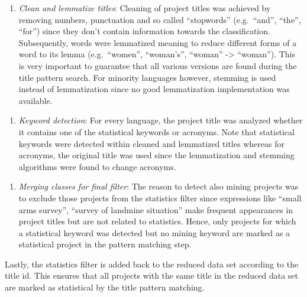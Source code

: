 \documentclass[
]{article}
\providecommand{\tightlist}{%
  \setlength{\itemsep}{0pt}\setlength{\parskip}{0pt}}
\begin{document}
\begin{enumerate}
  \begin{enumerate}
  \def\labelenumii{\roman{enumii}.}
  \setcounter{enumii}{1}
  \tightlist
  \item
    \emph{Clean and lemmatize titles}: Cleaning of project titles was achieved by removing numbers, punctuation and so called ``stopwords'' (e.g.~``and'', ``the'', ``for'') since they don't contain information towards the classification. Subsequently, words were lemmatized meaning to reduce different forms of a word to its lemma (e.g.~``women'', ``woman's'', ``woman'' -\textgreater{} ``woman''). This is very important to guarantee that all various versions are found during the title pattern search. For minority languages however, stemming is used instead of lemmatization since no good lemmatization implementation was available.
  \end{enumerate}

  \begin{enumerate}
  \def\labelenumii{\roman{enumii}.}
  \setcounter{enumii}{2}
  \tightlist
  \item
    \emph{Keyword detection}: For every language, the project title was analyzed whether it contains one of the statistical keywords or acronyms. Note that statistical keywords were detected within cleaned and lemmatized titles whereas for acronyms, the original title was used since the lemmatization and stemming algorithms were found to change acronyms.
  \end{enumerate}

  \begin{enumerate}
  \def\labelenumii{\roman{enumii}.}
  \setcounter{enumii}{3}
  \tightlist
  \item
    \emph{Merging classes for final filter}: The reason to detect also mining projects was to exclude those projects from the statistics filter since expressions like ``small arms survey'', ``survey of landmine situation'' make frequent appearances in project titles but are not related to statistics. Hence, only projects for which a statistical keyword was detected but no mining keyword are marked as a statistical project in the pattern matching step.
  \end{enumerate}
\end{enumerate}

Lastly, the statistics filter is added back to the reduced data set according to the title id. This ensures that all projects with the same title in the reduced data set are marked as statistical by the title pattern matching.
\end{document}
